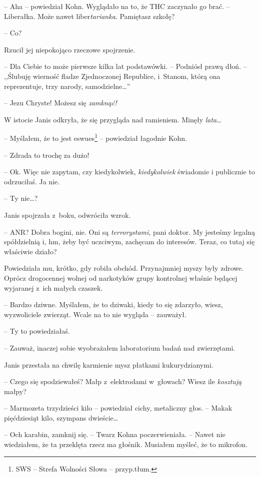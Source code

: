 \documentclass[oneside,polish,11pt,sfheadings]{mwbk}
\begin{document}
-- Aha -- powiedział Kohn. Wyglądało na to, że THC zaczynało go brać. --
Liberałka. Może nawet liber\emph{tarianka}. Pamiętasz szkołę?

-- Co?

Rzucił jej niepokojąco rzeczowe spojrzenie.

-- Dla Ciebie to może pierwsze kilka lat podstawówki. -- Podniósł prawą
dłoń. -- ,,Ślubuję wierność fladze Zjednoczonej Republice, i~Stanom, którą
ona reprezentuje, trzy narody, samodzielne\ldots''

-- Jezu Chryste! Możesz się \emph{zamknąć!}

W istocie Janis odkryła, że się przygląda nad ramieniem. Minęły
\emph{lata}\ldots

-- Myślałem, że to jest eswues\footnote{SWS -- Strefa Wolności Słowa -- przyp.tłum.} -- powiedział łagodnie Kohn.

-- Zdrada to trochę za dużo!

-- Ok. Więc nie zapytam, czy kiedykolwiek, \emph{kiedykolwiek} świadomie
i publicznie to odrzuciłaś. Ja nie.

-- Ty nie\ldots?

Janis spojrzała z~boku, odwróciła wzrok.

-- ANR? Dobra bogini, nie. Oni są \emph{terrorystami}, pani doktor. My
jesteśmy legalną spółdzielnią i, hm, żeby być uczciwym, zachęcam do
interesów. Teraz, co tutaj się właściwie działo?

Powiedziała mu, krótko, gdy robiła obchód. Przynajmniej myszy były
zdrowe. Oprócz drogocennej wolnej od narkotyków grupy kontrolnej właśnie
będącej wyjaranej z~ich małych czaszek.

-- Bardzo dziwne. Myślałem, że to dziwaki, kiedy to się zdarzyło, wiesz,
wyzwoliciele zwierząt. Wcale na to nie wygląda -- zauważył.

-- Ty to powiedziałaś.

-- Zauważ, inaczej sobie wyobrażałem laboratorium badań nad zwierzętami.

Janis przestała na chwilę karmienie mysz płatkami kukurydzianymi.

-- Czego się spodziewałeś? Małp z~elektrodami w~głowach? Wiesz ile
\emph{kosztują} małpy?

-- Marmozeta trzydzieści kilo -- powiedział cichy, metaliczny głos. -- Makak pięćdziesiąt kilo, szympans dwieście\ldots

-- Och karabin, zamknij się. -- Twarz Kohna poczerwieniała. -- Nawet nie
wiedziałem, że ta przeklęta rzecz ma głośnik. Musiałem myśleć, że to
mikrofon.
\end{document}
